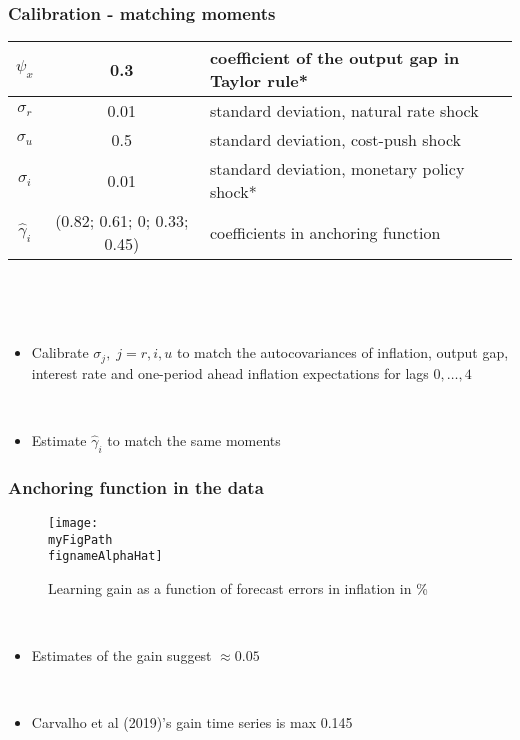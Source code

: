 \documentclass[10pt]{beamer}
\def \myFigPath {../../../figures/}
\def\mySmallerFigScale{0.18}
\def\meanalph{(0.82;    0.61;    0;    0.33;    0.45)}
\def\fignameAlphaHat{alph_opt_N_100_nfe_5_gridspacing_manual_Wdiffs2_100000_Wmid_1000_Nsimulations_command_sigmas_17_Sep_2020_12_05_56}
\begin{document}
\begin{frame}
	\frametitle{Calibration - matching moments}

\small{
\begin{center}
\begin{table}
\begin{tabular}{ c | c  | l }
\hline
 $\psi_x$ & 0.3   & coefficient of the output gap in Taylor rule*  \\\hline 
    $\sigma_r$ & 0.01 & standard deviation, natural rate shock  \\ \hline
    $\sigma_u$ & 0.5 & standard deviation, cost-push shock   \\ \hline  
    $\sigma_i$ &  0.01  &standard deviation, monetary policy shock*  \\ \hline
    $\hat{\gamma}_i$ &  \meanalph & coefficients in anchoring function \\ \hline  
     
\end{tabular}     
       \label{calibration}
 \end{table}
\end{center}
}

\

\

\begin{itemize}
\item Calibrate $\sigma_j, \; j=r,i,u$ to match the autocovariances of inflation, output gap, interest rate and one-period ahead inflation expectations for lags $0, \dots, 4$

\

\item Estimate $\hat{\gamma}_i$ to match the same moments
\end{itemize}





\end{frame}

\begin{frame}
	\frametitle{Anchoring function in the data}

\begin{figure}[h!]
\texttt{[image: \\myFigPath \\fignameAlphaHat]}
\caption{Learning gain as a function of forecast errors in inflation in \%}
\label{epi}
\end{figure}


\pause

\

\begin{itemize}
\item Estimates of the gain suggest $\approx 0.05$

\
\item Carvalho et al (2019)'s gain time series is max 0.145
\end{itemize}


\end{frame}
\end{document}
